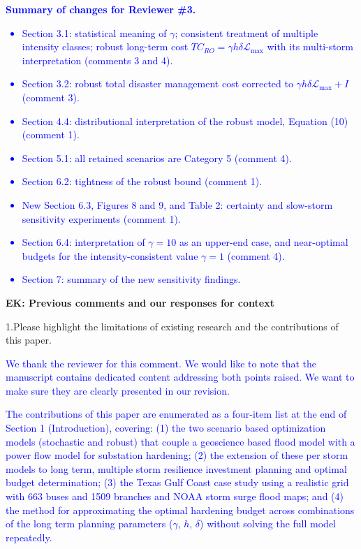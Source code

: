 \documentclass[authoryear,preprint,review,12pt]{elsarticle}\usepackage{amssymb}
\begin{document}
\bigskip

\textcolor{blue}{\textbf{Summary of changes for Reviewer \#3.}
\begin{itemize}
    \item Section 3.1: statistical meaning of $\gamma$; consistent treatment of multiple intensity classes; robust long-term cost $TC_{RO} = \gamma h \delta \mathcal{L}_{\max}$ with its multi-storm interpretation (comments 3 and 4).
    \item Section 3.2: robust total disaster management cost corrected to $\gamma h \delta \mathcal{L}_{\max} + I$ (comment 3).
    \item Section 4.4: distributional interpretation of the robust model, Equation (10) (comment 1).
    \item Section 5.1: all retained scenarios are Category 5 (comment 4).
    \item Section 6.2: tightness of the robust bound (comment 1).
    \item New Section 6.3, Figures 8 and 9, and Table 2: certainty and slow-storm sensitivity experiments (comment 1).
    \item Section 6.4: interpretation of $\gamma = 10$ as an upper-end case, and near-optimal budgets for the intensity-consistent value $\gamma = 1$ (comment 4).
    \item Section 7: summary of the new sensitivity findings.
\end{itemize}}


\textbf{EK: Previous comments and our responses for context}


1.Please highlight the limitations of existing research and the contributions of this paper.


\textcolor{blue}{We thank the reviewer for this comment. We would like to note that the manuscript contains dedicated content addressing both points raised. We want to make sure they are clearly presented in our revision.}

\textcolor{blue}{The contributions of this paper are enumerated as a four-item list at the end of Section 1 (Introduction), covering: (1) the two scenario based optimization models (stochastic and robust) that couple a geoscience based flood model with a power flow model for substation hardening; (2) the extension of these per storm models to long term, multiple storm resilience investment planning and optimal budget determination; (3) the Texas Gulf Coast case study using a realistic grid with 663 buses and 1509 branches and NOAA storm surge flood maps; and (4) the method for approximating the optimal hardening budget across combinations of the long term planning parameters ($\gamma$, $h$, $\delta$) without solving the full model repeatedly.}
\end{document}

